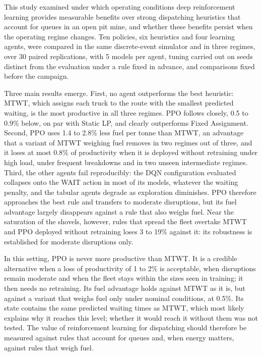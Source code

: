 \documentclass[11pt,a4paper]{article}
\newif\ifrevmarks
\newcommand{\revtag}[1]{\ifrevmarks\textsuperscript{\textcolor{red!70!black}{\scriptsize[#1]}}\fi}
\newenvironment{revbloc}[1]{\par\ifrevmarks\color{revcolor}\noindent\revtag{#1}\ \fi}{\par}
\newif\ifcorrmarks
\newcommand{\corr}[1]{\ifcorrmarks\textcolor{corrcolor}{#1}\else#1\fi}
\begin{document}
\begin{revbloc}{T31}
\corr{This study examined under which operating conditions deep reinforcement learning provides measurable benefits over strong dispatching heuristics that account for queues in an \corr{open pit} mine, and whether these benefits persist when the operating regime changes.} Ten policies, six heuristics and four learning agents, were compared in the same discrete-event simulator and in three regimes, over 30 paired replications, with 5 models per agent, tuning carried out on seeds distinct from the evaluation under a rule fixed in advance, and comparisons fixed before the campaign.

Three main results emerge. First, no agent outperforms the best heuristic: MTWT, which assigns each truck to the route with the smallest predicted waiting, is the most productive in all three regimes. PPO follows closely, 0.5 to 0.9\% below, on par with \corr{Static LP}, and clearly outperforms Fixed Assignment. Second, PPO uses 1.4 to 2.8\% less fuel per tonne than MTWT\corr{, an advantage that a variant of MTWT weighing fuel removes in two regimes out of three}, and \corr{it loses at most 0.8\% of productivity} when it is deployed without retraining under high load, under frequent breakdowns and in two unseen intermediate regimes. Third, the other agents fail reproducibly: \corr{the DQN configuration evaluated} collapses onto the \corr{WAIT} action in most of its models, whatever the waiting penalty, and the tabular agents degrade as exploration diminishes. \corr{PPO therefore approaches the best rule and transfers to moderate disruptions, but its fuel advantage largely disappears against a rule that also weighs fuel.} \corr{Near the saturation of the shovels, however, rules that spread the fleet overtake MTWT and PPO deployed without retraining loses 3 to 19\% against it: its robustness is established for moderate disruptions only.}

\corr{In this setting, PPO is never more productive than MTWT. It is a credible alternative when a loss of productivity of 1 to 2\% is acceptable, when disruptions remain moderate and when the fleet stays within the sizes seen in training; it then needs no retraining. Its fuel advantage holds against MTWT as it is, but against a variant that weighs fuel only under nominal conditions, at 0.5\%. Its state contains the same predicted waiting times as MTWT, which most likely explains why it reaches this level; whether it would reach it without them was not tested. The value of reinforcement learning for dispatching should therefore be measured against rules that account for queues and, when energy matters, against rules that weigh fuel.}


\end{revbloc}
\end{document}
